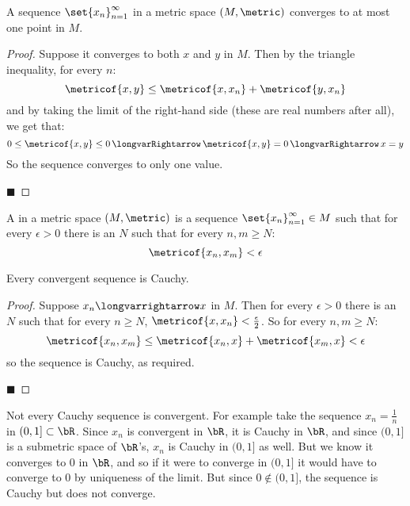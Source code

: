 \documentclass[10pt]{article}
\def\implies{\,\longvarRightarrow\,}
\begin{document}
\begin{prop*}

    A sequence $\set{x_n}_{n=1}^\infty$ in a metric space $(M,\metric)$ converges to at most one point in $M$.

\end{prop*}

\begin{proof}

    Suppose it converges to both $x$ and $y$ in $M$.
    Then by the triangle inequality, for every $n$:
    \[ \metricof{x,y} \leq \metricof{x,x_n} + \metricof{y,x_n} \]
    and by taking the limit of the right-hand side (these are real numbers after all), we get that:
    \[ 0\leq\metricof{x,y}\leq0 \implies \metricof{x,y}=0 \implies x=y \]
    So the sequence converges to only one value.

    \hfill$\blacksquare$

\end{proof}

\begin{defn*}

    A  in a metric space $(M,\metric)$ is a sequence $\set{x_n}_{n=1}^\infty\in M$ such that for every $\epsilon>0$ there is an $N$ such that for every $n,m\geq N$:
    \[ \metricof{x_n, x_m} < \epsilon \]

\end{defn*}

\begin{prop*}

    Every convergent sequence is Cauchy.

\end{prop*}

\begin{proof}

    Suppose $x_n\longvarrightarrow x$ in $M$.
    Then for every $\epsilon>0$ there is an $N$ such that for every $n\geq N$, $\metricof{x,x_n}<\frac\epsilon2$.
    So for every $n,m\geq N$:
    \[ \metricof{x_n, x_m} \leq \metricof{x_n,x} + \metricof{x_m,x} < \epsilon \]
    so the sequence is Cauchy, as required.

    \hfill$\blacksquare$

\end{proof}

\begin{exam*}

    Not every Cauchy sequence is convergent.
    For example take the sequence $x_n=\frac1n$ in $(0,1]\subset\bR$.
    Since $x_n$ is convergent in $\bR$, it is Cauchy in $\bR$, and since $(0,1]$ is a submetric space of $\bR$'s, $x_n$ is Cauchy in $(0,1]$ as well.
    But we know it converges to $0$ in $\bR$, and so if it were to converge in $(0,1]$ it would have to converge to $0$ by uniqueness of the limit.
    But since $0\notin(0,1]$, the sequence is Cauchy but does not converge.

\end{exam*}
\end{document}
